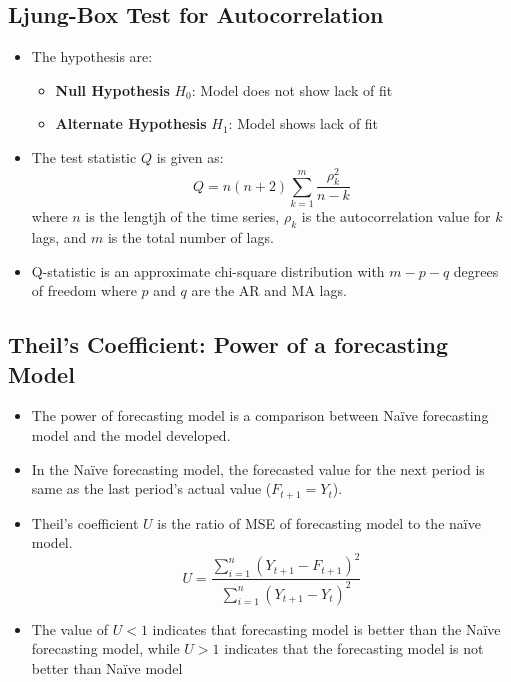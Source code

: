 \documentclass{article}
\theoremstyle{plain}
\theoremstyle{definition}
\begin{document}
\subsection{Ljung-Box Test for Autocorrelation}
\begin{itemize}
    \item The hypothesis are:
    \begin{itemize}
        \item \textbf{Null Hypothesis} $H_0$: Model does not show lack of fit
    \item \textbf{Alternate Hypothesis} $H_1$: Model shows lack of fit
    \end{itemize}
    
    \item The test statistic $Q$ is given as:
    \begin{equation}
        Q = n(n+2)\sum_{k=1}^{m}\frac{\rho_k^2}{n-k}
    \end{equation}
    where $n$ is the lengtjh of the time series, $\rho_k$ is the autocorrelation value for $k$ lags, and $m$ is the total number of lags. 
    
    \item Q-statistic is an approximate chi-square distribution with $m - p - q$ degrees of freedom where $p$ and $q$ are the AR and MA lags.
\end{itemize}

\subsection{Theil's Coefficient: Power of a forecasting Model}
\begin{itemize}
    \item The power of forecasting model is a comparison between Naïve forecasting model and the model developed.
    
    \item In the Naïve forecasting model, the forecasted value for the next period is same as the last period’s actual value ($F_{t+1} = Y_t$).
    
    \item Theil's coefficient $U$ is the ratio of MSE of forecasting model to the naïve model.
    \begin{equation}
        U = \frac{\sum\limits_{i=1}^n (Y_{t+1} - F_{t+1})^2}{\sum\limits_{i=1}^n (Y_{t+1} - Y_{t})^2}
    \end{equation}
    
    \item The value of $U < 1$ indicates that forecasting model is better than the Naïve forecasting model, while $U > 1$ indicates that the forecasting model is not better than Naïve model
\end{itemize}
\end{document}
